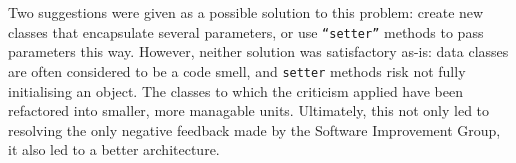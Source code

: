 Two suggestions were given as a possible solution to this problem: create new
classes that encapsulate several parameters, or use \texttt{``setter''} methods
to pass parameters this way. However, neither solution was satisfactory as-is:
data classes are often considered to be a code smell, and \texttt{setter}
methods risk not fully initialising an object. The classes to which the
criticism applied have been refactored into smaller, more managable units.
Ultimately, this not only led to resolving the only negative feedback made by
the Software Improvement Group, it also led to a better architecture.

